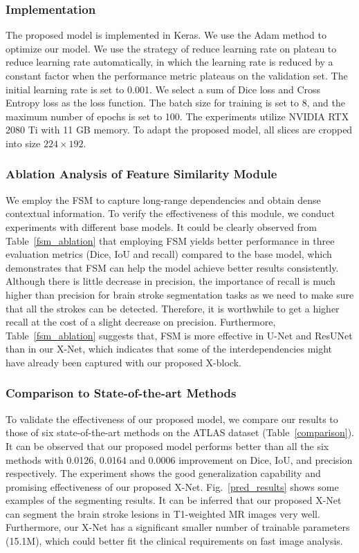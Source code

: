 \documentclass[runningheads]{llncs}
\begin{document}
\subsubsection{Implementation}
The proposed model is implemented in Keras. We use the Adam \cite{[23]} method to optimize our model.  We use the strategy of reduce learning rate on plateau to reduce learning rate automatically, in which the learning rate is reduced by a constant factor when the performance metric plateaus on the validation set. The initial learning rate is set to 0.001. We select a sum of Dice loss and Cross Entropy loss as the loss function. The batch size for training is set to 8, and the maximum number of epochs is set to 100. The experiments utilize NVIDIA RTX 2080 Ti with 11 GB memory. To adapt the proposed model, all slices are cropped into size $224\times 192$. 

\subsubsection{Ablation Analysis of Feature Similarity Module}
We employ the FSM to capture long-range dependencies and obtain dense contextual information. To verify the effectiveness of this module, we conduct experiments with different base models. It could be clearly observed from Table~\ref{fsm_ablation} that employing FSM yields better performance in three evaluation metrics (Dice, IoU and recall) compared to the base model, which demonstrates that FSM can help the model achieve better results consistently. Although there is little decrease in precision, the importance of recall is much higher than precision for brain stroke segmentation tasks as we need to make sure that all the strokes can be detected. Therefore, it is worthwhile to get a higher recall at the cost of a slight decrease on precision. Furthermore, Table~\ref{fsm_ablation} suggests that, FSM is more effective in U-Net and ResUNet than in our X-Net, which indicates that some of the interdependencies might have already been captured with our proposed X-block. 



\subsubsection{Comparison to State-of-the-art Methods}
To validate the effectiveness of our proposed model, we compare our results to those of six state-of-the-art methods on the ATLAS dataset (Table~\ref{comparison}). It can be observed that our proposed model performs better than all the six methods with 0.0126, 0.0164 and 0.0006 improvement on Dice, IoU, and precision respectively. The experiment shows the good generalization capability and promising effectiveness of our proposed X-Net. Fig.~\ref{pred_results} shows some examples of the segmenting results. It can be inferred that our proposed X-Net can segment the brain stroke lesions in T1-weighted MR images very well. Furthermore, our X-Net has a significant smaller number of trainable parameters (15.1M), which could better fit the clinical requirements on fast image analysis.
\end{document}
